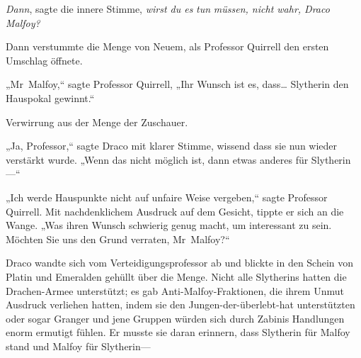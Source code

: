 \emph{Dann}, sagte die innere Stimme, \emph{wirst du es} \emph{tun} \emph{müssen, nicht wahr, Draco Malfoy?}

Dann verstummte die Menge von Neuem, als Professor Quirrell den ersten Umschlag öffnete.

„Mr~Malfoy,“ sagte Professor Quirrell, „Ihr Wunsch ist es, dass… Slytherin den Hauspokal gewinnt.“

Verwirrung aus der Menge der Zuschauer.

„Ja, Professor,“ sagte Draco mit klarer Stimme, wissend dass sie nun wieder verstärkt wurde. „Wenn das nicht möglich ist, dann etwas anderes für Slytherin—“

„Ich werde Hauspunkte nicht auf unfaire Weise vergeben,“ sagte Professor Quirrell. Mit nachdenklichem Ausdruck auf dem Gesicht, tippte er sich an die Wange. „Was ihren Wunsch schwierig genug macht, um interessant zu sein. Möchten Sie uns den Grund verraten, Mr~Malfoy?“

Draco wandte sich vom Verteidigungsprofessor ab und blickte in den Schein von Platin und Emeralden gehüllt über die Menge. Nicht alle Slytherins hatten die Drachen-Armee unterstützt; es gab Anti-Malfoy-Fraktionen, die ihrem Unmut Ausdruck verliehen hatten, indem sie den Jungen-der-überlebt-hat unterstützten oder sogar Granger und jene Gruppen würden sich durch Zabinis Handlungen enorm ermutigt fühlen. Er musste sie daran erinnern, dass Slytherin für Malfoy stand und Malfoy für Slytherin—

